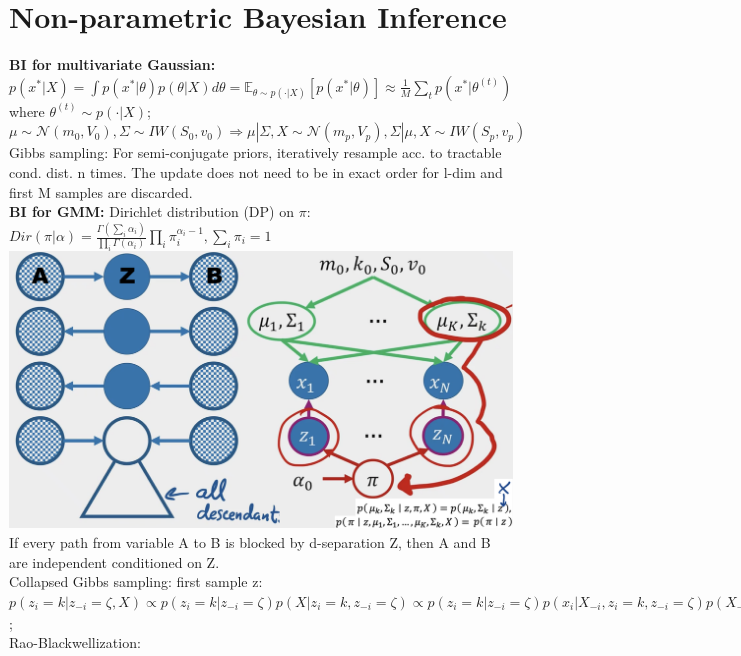 \section{Non-parametric Bayesian Inference}
\textbf{BI for multivariate Gaussian: } $p(x^*|X) = \int p(x^*|\theta)p(\theta|X)d\theta = \mathbb{E}_{\theta \sim p(\cdot | X)}[p(x^*|\theta)] \approx \frac{1}{M}\sum_t p(x^*|\theta^{(t)})$ where $\theta^{(t)}\sim p(\cdot | X)$; $\mu \sim \mathcal{N}(m_0, V_0), \Sigma \sim IW(S_0, v_0) \Rightarrow \mu | \Sigma, X \sim \mathcal{N}(m_p, V_p), \Sigma | \mu, X \sim IW(S_p, v_p)$ Gibbs sampling: For semi-conjugate priors, iteratively resample acc. to tractable cond. dist. n times. The update does not need to be in exact order for l-dim and first M samples are discarded. \\
\textbf{BI for GMM: } Dirichlet distribution (DP) on $\pi$: $Dir(\pi|\alpha) = \frac{\Gamma(\sum_i \alpha_i)}{\prod_i \Gamma(\alpha_i)} \prod_i \pi_i^{\alpha_i - 1}, \sum_i \pi_i = 1$ \\
\includegraphics[scale=0.125]{d-separation.png}\\
If every path from variable A to B is blocked by d-separation Z, then A and B are independent conditioned on Z.\\
Collapsed Gibbs sampling: first sample z: $p(z_i = k | z_{-i} = \zeta, X) \propto p(z_i = k | z_{-i} = \zeta)p(X|z_i=k, z_{-i}=\zeta) \propto p(z_i = k | z_{-i} = \zeta)p(x_i|X_{-i}, z_i=k, z_{-i}=\zeta)p(X_{-i}|z_i=k, z_{-i}=\zeta) \propto p(z_i = k | z_{-i} = \zeta)p(x_i | \{x_j: j \leq N_{i \neq j}, z_j = k\})const$; \\
Rao-Blackwellization:
